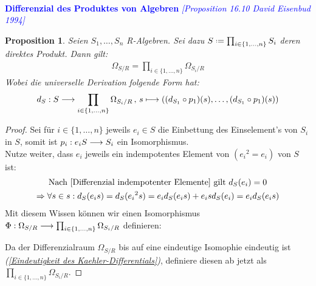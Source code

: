 \documentclass[10pt,a4paper]{report}
\newcommand{\ModulsOfDifferenzials}{David Eisenbud 1994}
\newcounter{Aussage}[chapter]
\newtheorem{prop}[Aussage]{Proposition}
\newcommand{\functionfront}[3]{\nolinebreak{#1:#2 \longrightarrow #3}}
\newcommand{\function}[5]{\nolinebreak{#1:#2 \longrightarrow #3 \, , \, #4 \longmapsto #5}}
\newcommand{\divR}[2]{\Omega_{#1/#2}}
\newcommand{\divf}[1]{d_{#1}}
\newcommand*{\defeq}{\mathrel{\vcenter{\baselineskip0.5ex \lineskiplimit0pt
                     \hbox{\scriptsize.}\hbox{\scriptsize.}}}%
                     =}
\begin{document}
\ \\
\textcolor{blue}{\textbf{Differenzial des Produktes von Algebren} \textit{[Proposition 16.10 \ModulsOfDifferenzials]}}
\begin{prop}\label{Differenzial des Produktes von Algebren}
Seien $S_1, \dots , S_n$ R-Algebren. Sei dazu $S \defeq \prod_{i \in \lbrace 1, \dots , n \rbrace} S_i$ deren direktes Produkt.
Dann gilt:
\begin{gather*}
\divR{S}{R} = \prod_{i \in \lbrace 1, \dots , n \rbrace} \divR{S_i}{R}
\end{gather*}
Wobei die universelle Derivation folgende Form hat:
\begin{gather*}
\function{\divf{S}}{S}{\prod_{i \in \lbrace 1, \dots , n \rbrace} \divR{S_i}{R}}{s}{((\divf{S_1} \circ p_1)(s) , \dots , (\divf{S_1} \circ p_1)(s) )}
\end{gather*}
\end{prop}
\begin{proof}
Sei für $i \in \lbrace 1, \dots ,n \rbrace$ jeweils $e_i \in S$ die Einbettung des Einselement's von $S_i$ in $S$, somit ist $\functionfront{p_i}{e_iS}{S_i}$ ein Isomorphismus.\\
Nutze weiter, dass $e_i$ jeweils ein indempotentes Element von $({e_i}^2 = e_i)$ von $S$ ist:
\begin{gather*}
\text{Nach \cref{Differenzial indempotenter Elemente} gilt } \divf{S}(e_i) = 0 \\
\Rightarrow \forall s \in s : \divf{S}(e_is)= \divf{S}({e_i}^2s) = e_i\divf{S}(e_is) + e_is\divf{S}(e_i) = e_i\divf{S}(e_is) \\
\end{gather*}
Mit diesem Wissen können wir einen Isomorphismus $\functionfront{\Phi}{\divR{S}{R}}{\prod_{i \in \lbrace 1, \dots , n \rbrace} \divR{S_i}{R}}$ definieren:
\begin{center}
\end{center}
Da der Differenzialraum $\divR{S}{R}$ bis auf eine eindeutige Isomophie eindeutig ist \textit{(\cref{Eindeutigkeit des Kaehler-Differentials})}, definiere diesen ab jetzt als $\prod_{i \in \lbrace 1, \dots , n \rbrace} \divR{S_i}{R}$.
\end{proof}
\end{document}
